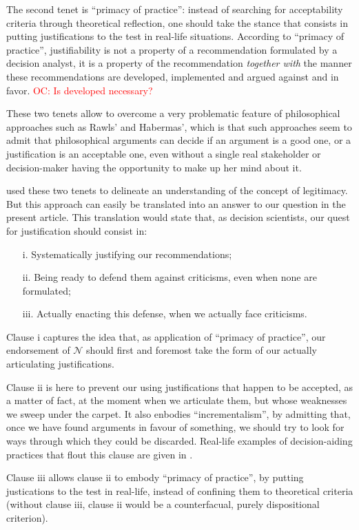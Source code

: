 \documentclass[preprint, french, english, 11pt, authoryear]{elsarticle}%
\newcommand{\commentOC}[1]{\textcolor{red}{OC: #1}}
\newcommand{\adv}{\mathscr{N}}
\begin{document}
The second tenet is ``primacy of practice'': instead of searching for acceptability criteria through theoretical reflection, one should take the stance that consists in putting justifications to the test in real-life situations. According to ``primacy of practice'', justifiability is not a property of a recommendation formulated by a decision analyst, it is a property of the recommendation \emph{together with} the manner these recommendations are developed, implemented and argued against and in favor. \commentOC{Is developed necessary?}

These two tenets allow to overcome a very problematic feature of philosophical approaches such as Rawls' and Habermas', which is that such approaches seem to admit that philosophical arguments can decide if an argument is a good one, or a justification is an acceptable one, even without a single real stakeholder or decision-maker having the opportunity to make up her mind about it.

\cite{meinard_what_2017} used these two tenets to delineate an understanding of the concept of legitimacy. But this approach can easily be translated into an answer to our question in the present article. This translation would state that, as decision scientists, our quest for justification should consist in:
\begin{itemize}
\item[i.]	Systematically justifying our recommendations;
\item[ii.]	Being ready to defend them against criticisms, even when none are formulated;
\item[iii.]	Actually enacting this defense, when we actually face criticisms.
\end{itemize}

Clause i captures the idea that, as application of ``primacy of practice'', our endorsement of $\adv$ should first and foremost take the form of our actually articulating justifications.

Clause ii is here to prevent our using justifications that happen to be accepted, as a matter of fact, at the moment when we articulate them, but whose weaknesses we sweep under the carpet. It also enbodies ``incrementalism'', by admitting that, once we have found arguments in favour of something, we should try to look for ways through which they could be discarded. Real-life examples of decision-aiding practices that flout this clause are given in \cite{meinard_what_2017}.

Clause iii allows clause ii to embody ``primacy of practice'', by putting justications to the test in real-life, instead of confining them to theoretical criteria (without clause iii, clause ii would be a counterfacual, purely dispositional criterion).
\end{document}
